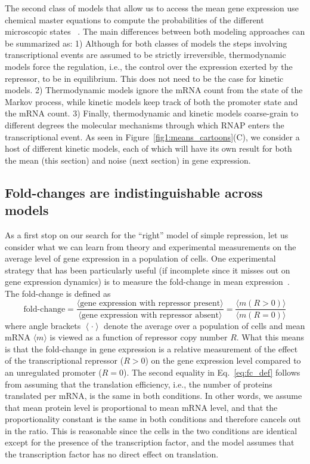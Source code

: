The second class of models that allow us to access the mean gene expression use
chemical master equations to compute the probabilities of the different
microscopic states ~\cite{Ko1991, Peccoud1995, Record1996, Kepler2001,
Sanchez2008, Shahrezaei2008, Sanchez2011, Michel2010}. The main differences
between both modeling approaches can be summarized as: 1) Although for both
classes of models the steps involving transcriptional events are assumed to be
strictly irreversible, thermodynamic models force the regulation, i.e., the
control over the expression exerted by the repressor, to be in equilibrium. This
does not need to be the case for kinetic models. 2) Thermodynamic models ignore
the mRNA count from the state of the Markov process, while kinetic models keep
track of both the promoter state and the mRNA count. 3) Finally, thermodynamic
and kinetic models coarse-grain to different degrees the molecular mechanisms
through which RNAP enters the transcriptional event. As seen in
Figure~\ref{fig1:means_cartoons}(C), we consider a host of different kinetic
models, each of which will have its own result for both the mean (this section)
and noise (next section) in gene expression.

\subsection{Fold-changes are indistinguishable across models}
As a first stop on our search for the ``right'' model of simple repression, let
us consider what we can learn from theory and experimental measurements on the
average level of gene expression in a population of cells. One experimental
strategy that has been particularly useful (if incomplete since it misses out on
gene expression dynamics) is to measure the fold-change in mean
expression~\cite{Garcia2011}. The fold-change is defined as
\begin{equation}
\text{fold-change}
= \frac{\langle \text{gene expression with repressor present} \rangle}
        {\langle \text{gene expression with repressor absent} \rangle}
= \frac{\langle m (R > 0) \rangle}{\langle m (R = 0) \rangle}
\label{eq:fc_def}
\end{equation}
where angle brackets $\left\langle \cdot \right\rangle$ denote the average over
a population of cells and mean mRNA $\langle m\rangle$ is viewed as a function
of repressor copy number $R$. What this means is that the fold-change in gene
expression is a relative measurement of the effect of the transcriptional
repressor ($R > 0$) on the gene expression level compared to an unregulated
promoter ($R = 0$). The second equality in Eq.~\ref{eq:fc_def} follows from
assuming that the translation efficiency, i.e., the number of proteins
translated per mRNA, is the same in both conditions. In other words, we assume
that mean protein level is proportional to mean mRNA level, and that the
proportionality constant is the same in both conditions and therefore cancels
out in the ratio. This is reasonable since the cells in the two conditions are
identical except for the presence of the transcription factor, and the model
assumes that the transcription factor has no direct effect on translation.

